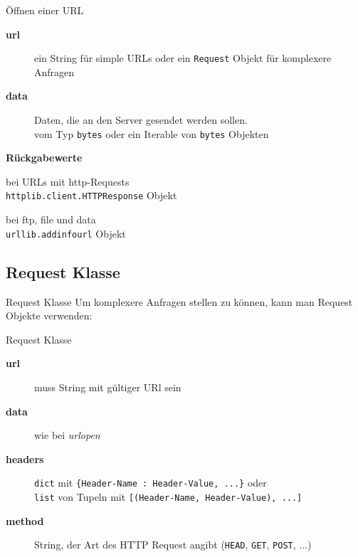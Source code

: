 \begin{frame}[fragile]{\"Offnen einer URL}
	\begin{description}
		\item[\textbf{url}] ein String f\"ur simple URLs oder ein \texttt{Request} Objekt f\"ur komplexere Anfragen
		\item[\textbf{data}] Daten, die an den Server gesendet werden sollen. \\
		vom Typ \texttt{bytes} oder ein Iterable von \texttt{bytes} Objekten \\[.75cm]
	\end{description}
	\textbf{R\"uckgabewerte}
	\begin{description}
		\item bei URLs mit http-Requests \\
		\hspace*{1cm}\texttt{httplib.client.HTTPResponse} Objekt
		\item bei ftp, file und data \\
		\hspace*{1cm}\texttt{urllib.addinfourl} Objekt
	\end{description}
\end{frame}

\subsection{Request Klasse}
\begin{frame}{Request Klasse}
	Um komplexere Anfragen stellen zu k\"onnen, kann man Request Objekte verwenden:
	
\end{frame}

\begin{frame}{Request Klasse}
	\begin{description}
		\item[\textbf{url}] muss String mit g\"ultiger URl sein
		\item[\textbf{data}] wie bei \textit{urlopen}
		\item[\textbf{headers}] \texttt{dict} mit \texttt{\{Header-Name : Header-Value, ...\}} oder \\
		\texttt{list} von Tupeln mit \texttt{[(Header-Name, Header-Value), ...]}
		\item[\textbf{method}] String, der Art des HTTP Request angibt (\texttt{HEAD}, \texttt{GET}, \texttt{POST}, ...)
	\end{description}
\end{frame}

